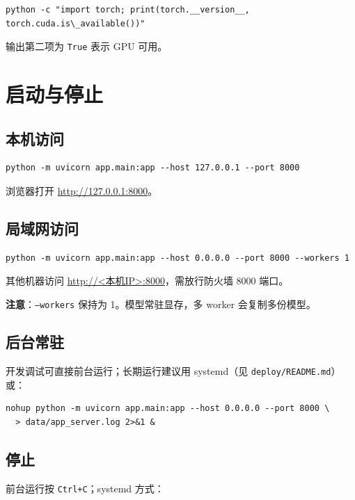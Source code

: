\documentclass[12pt,a4paper]{article}
\begin{document}
\begin{lstlisting}
python -c "import torch; print(torch.__version__, torch.cuda.is\_available())"
\end{lstlisting}

输出第二项为 \texttt{True} 表示 GPU 可用。

\section{启动与停止}

\subsection{本机访问}

\begin{lstlisting}
python -m uvicorn app.main:app --host 127.0.0.1 --port 8000
\end{lstlisting}

浏览器打开 \url{http://127.0.0.1:8000}。

\subsection{局域网访问}

\begin{lstlisting}
python -m uvicorn app.main:app --host 0.0.0.0 --port 8000 --workers 1
\end{lstlisting}

其他机器访问 \url{http://<本机IP>:8000}，需放行防火墙 8000 端口。

\textbf{注意}：\texttt{--workers} 保持为 1。模型常驻显存，多 worker 会复制多份模型。

\subsection{后台常驻}

开发调试可直接前台运行；长期运行建议用 systemd（见 \texttt{deploy/README.md}）或：

\begin{lstlisting}
nohup python -m uvicorn app.main:app --host 0.0.0.0 --port 8000 \
  > data/app_server.log 2>&1 &
\end{lstlisting}

\subsection{停止}

前台运行按 \texttt{Ctrl+C}；systemd 方式：
\end{document}
